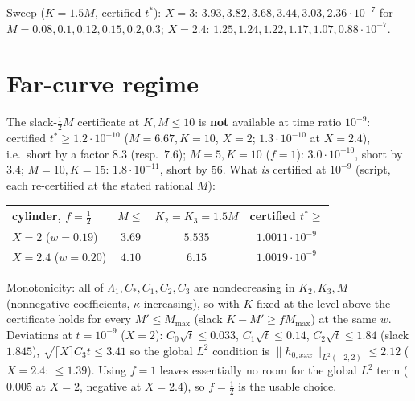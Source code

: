 \documentclass[11pt]{article}
\begin{document}
Sweep ($K=1.5M$, certified $t^*$): $X=3$: $3.93,3.82,3.68,3.44,3.03,2.36\cdot10^{-7}$ for $M=0.08,0.1,0.12,0.15,0.2,0.3$; $X=2.4$: $1.25,1.24,1.22,1.17,1.07,0.88\cdot10^{-7}$.

\section{Far-curve regime}
The slack-$\frac12M$ certificate at $K,M\le10$ is \textbf{not} available at time ratio $10^{-9}$: certified $t^*\ge1.2\cdot10^{-10}$ ($M=6.67,K=10$, $X=2$; $1.3\cdot10^{-10}$ at $X=2.4$), i.e.\ short by a factor $8.3$ (resp.\ $7.6$); $M=5,K=10$ ($f=1$): $3.0\cdot10^{-10}$, short by $3.4$; $M=10,K=15$: $1.8\cdot10^{-11}$, short by $56$. What \emph{is} certified at $10^{-9}$ (script, each re-certified at the stated rational $M$):
\begin{center}\small\begin{tabular}{lccc}\toprule
cylinder, $f=\frac12$ & $M\le$ & $K_2=K_3=1.5M$ & certified $t^*\ge$\\\midrule
$X=2$ ($w=0.19$) & $3.69$ & $5.535$ & $1.0011\cdot10^{-9}$\\
$X=2.4$ ($w=0.20$) & $4.10$ & $6.15$ & $1.0019\cdot10^{-9}$\\\bottomrule
\end{tabular}\end{center}
Monotonicity: all of $\Lambda_1,C_*,C_1,C_2,C_3$ are nondecreasing in $K_2,K_3,M$ (nonnegative coefficients, $\kappa$ increasing), so with $K$ fixed at the level above the certificate holds for every $M'\le M_{\max}$ (slack $K-M'\ge fM_{\max}$) at the same $w$. Deviations at $t=10^{-9}$ ($X=2$): $C_0\sqrt t\le0.033$, $C_1\sqrt t\le0.14$, $C_2\sqrt t\le1.84$ (slack $1.845$), $\sqrt{\lceil X\rceil C_3t}\le3.41$ so the global $L^2$ condition is $\|h_{0,xxx}\|_{L^2(-2,2)}\le2.12$ ($X=2.4$: $\le1.39$). Using $f=1$ leaves essentially no room for the global $L^2$ term ($0.005$ at $X=2$, negative at $X=2.4$), so $f=\frac12$ is the usable choice.
\end{document}
